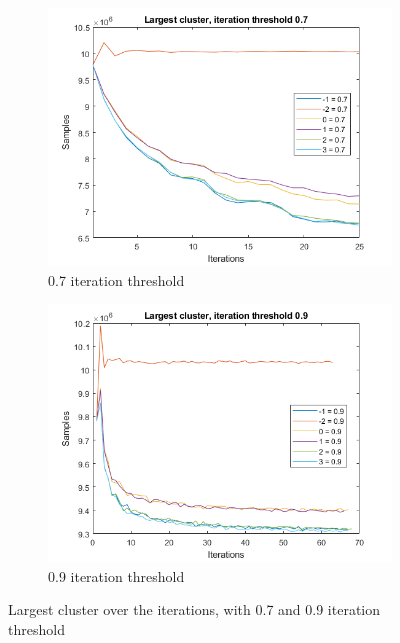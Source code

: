 \begin{figure}
    \centering
    \begin{subfigure}[b]{.49\textwidth}
        \centering
        \includegraphics[width=\textwidth]{figures/largest-0.7.png}
        \caption{0.7 iteration threshold}
        \label{sfig:iter:largestcluster0.7}
    \end{subfigure}
    \hfill
    \begin{subfigure}[b]{.49\textwidth}
        \centering
        \includegraphics[width=\textwidth]{figures/largest-0.9.png}
        \caption{0.9 iteration threshold}
        \label{sfig:iter:largestcluster0.9}
    \end{subfigure}
    \caption{Largest cluster over the iterations, with 0.7 and 0.9 iteration threshold}
    \label{fig:iter:largestcluster0.70.9}
\end{figure}

